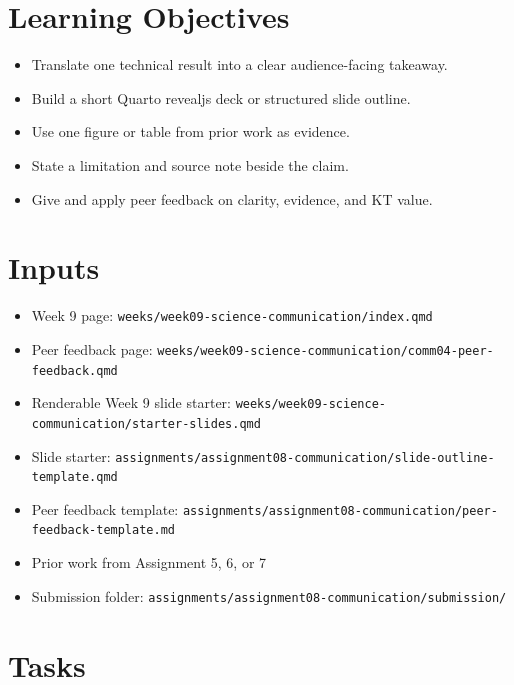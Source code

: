 \documentclass[
  letterpaper,
  DIV=11,
  numbers=noendperiod,
  oneside]{scrreprt}
\providecommand{\tightlist}{%
  \setlength{\itemsep}{0pt}\setlength{\parskip}{0pt}}
\begin{document}
\section{Learning Objectives}\label{learning-objectives-9}

\begin{itemize}
\tightlist
\item
  Translate one technical result into a clear audience-facing takeaway.
\item
  Build a short Quarto revealjs deck or structured slide outline.
\item
  Use one figure or table from prior work as evidence.
\item
  State a limitation and source note beside the claim.
\item
  Give and apply peer feedback on clarity, evidence, and KT value.
\end{itemize}

\section{Inputs}\label{inputs-9}

\begin{itemize}
\tightlist
\item
  Week 9 page: \texttt{weeks/week09-science-communication/index.qmd}
\item
  Peer feedback page:
  \texttt{weeks/week09-science-communication/comm04-peer-feedback.qmd}
\item
  Renderable Week 9 slide starter:
  \texttt{weeks/week09-science-communication/starter-slides.qmd}
\item
  Slide starter:
  \texttt{assignments/assignment08-communication/slide-outline-template.qmd}
\item
  Peer feedback template:
  \texttt{assignments/assignment08-communication/peer-feedback-template.md}
\item
  Prior work from Assignment 5, 6, or 7
\item
  Submission folder:
  \texttt{assignments/assignment08-communication/submission/}
\end{itemize}

\section{Tasks}\label{tasks-7}
\end{document}

